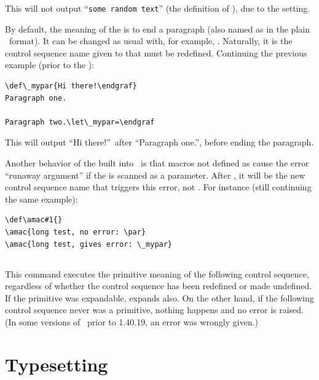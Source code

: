 \documentclass{pdftexmanual}
\begin{document}
This will not output ``\verb|some random text|'' (the definition of
), due to the  setting.

By default, the meaning of the  is to end a paragraph
(also named as  in the plain \TEX\ format). It can be
changed as usual with, for example, . Naturally, it is the
control sequence name given to  that must be
redefined. Continuing the previous example (prior to the ):

\begin{verbatim}
\def\_mypar{Hi there!\endgraf}
Paragraph one.

Paragraph two.\let\_mypar=\endgraf
\end{verbatim}

This will output ``Hi there!''\ after ``Paragraph one.'', before ending
the paragraph.

Another behavior of the  built into \TEX\ is that
macros not defined as  cause the error ``runaway argument'' if
the  is scanned as a parameter. After
, it will be the new control sequence name that
triggers this error, not . For instance (still continuing the
same example):

\begin{verbatim}
\def\amac#1{}
\amac{long test, no error: \par}
\amac{long test, gives error: \_mypar}
\end{verbatim}


\subsection{}

This command executes the primitive meaning of the following control
sequence, regardless of whether the control sequence has been redefined
or made undefined. If the primitive was expandable, 
expands also. On the other hand, if the following control sequence never
was a primitive, nothing happens and no error is raised. (In some
versions of \PDFTEX\ prior to 1.40.19, an error was wrongly given.)

\section{Typesetting}
\end{document}
